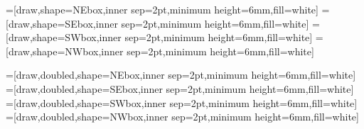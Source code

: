 \makeatother

=[draw,shape=NEbox,inner sep=2pt,minimum height=6mm,fill=white]
=[draw,shape=SEbox,inner sep=2pt,minimum height=6mm,fill=white]
=[draw,shape=SWbox,inner sep=2pt,minimum height=6mm,fill=white]
=[draw,shape=NWbox,inner sep=2pt,minimum height=6mm,fill=white]

=[draw,doubled,shape=NEbox,inner sep=2pt,minimum height=6mm,fill=white]
=[draw,doubled,shape=SEbox,inner sep=2pt,minimum height=6mm,fill=white]
=[draw,doubled,shape=SWbox,inner sep=2pt,minimum height=6mm,fill=white]
=[draw,doubled,shape=NWbox,inner sep=2pt,minimum height=6mm,fill=white]

\makeatletter
{}

